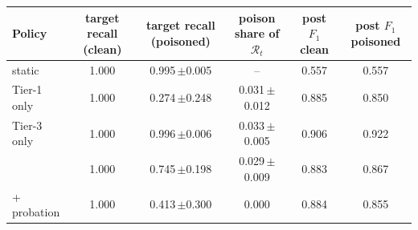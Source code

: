 \begin{tabular}{@{}lccccc@{}}
\toprule
Policy & target recall (clean) & target recall (poisoned) & poison share of $\mathcal R_t$ & post $F_1$ clean & post $F_1$ poisoned \\
\midrule
static & 1.000 & 0.995{\,\scriptsize$\pm$0.005} & -- & 0.557 & 0.557 \\
Tier-1 only & 1.000 & 0.274{\,\scriptsize$\pm$0.248} & 0.031{\,\scriptsize$\pm$0.012} & 0.885 & 0.850 \\
Tier-3 only & 1.000 & 0.996{\,\scriptsize$\pm$0.006} & 0.033{\,\scriptsize$\pm$0.005} & 0.906 & 0.922 \\
\drift{} & 1.000 & 0.745{\,\scriptsize$\pm$0.198} & 0.029{\,\scriptsize$\pm$0.009} & 0.883 & 0.867 \\
\drift{} + probation & 1.000 & 0.413{\,\scriptsize$\pm$0.300} & 0.000 & 0.884 & 0.855 \\
\bottomrule
\end{tabular}